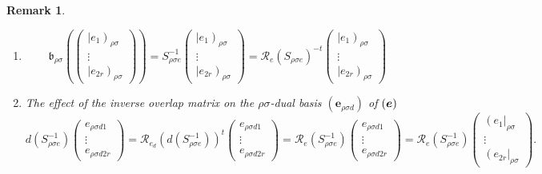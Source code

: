 \documentclass[aps,preprint]{revtex4}
\newtheorem{remark}[theorem]{Remark}
\begin{document}
\begin{remark}
\begin{enumerate}
\begin{enumerate}
\item 
\begin{equation}
\mathfrak{b}_{\rho \sigma }\left( \left( 
\begin{array}{c}
\left\vert e_{1}\right) _{\rho \sigma } \\ 
\vdots \\ 
\left\vert e_{2r}\right) _{\rho \sigma }%
\end{array}%
\right) \right) =S_{\rho \sigma e}^{-1}\left( 
\begin{array}{c}
\left\vert e_{1}\right) _{\rho \sigma } \\ 
\vdots \\ 
\left\vert e_{2r}\right) _{\rho \sigma }%
\end{array}%
\right) =\mathcal{R}_{e}\left( S_{\rho \sigma e}\right) ^{-t}\left( 
\begin{array}{c}
\left\vert e_{1}\right) _{\rho \sigma } \\ 
\vdots \\ 
\left\vert e_{2r}\right) _{\rho \sigma }%
\end{array}%
\right)
\end{equation}

\item The effect of the inverse overlap matrix on the $\rho \sigma $-dual
basis $\left( \boldsymbol{e}_{\rho \sigma d}\right) $ of $\left( \boldsymbol{%
e}\right) $ 
\begin{equation}
d\left( S_{\rho \sigma e}^{-1}\right) \left( 
\begin{array}{c}
e_{\rho \sigma d1} \\ 
\vdots \\ 
e_{\rho \sigma d2r}%
\end{array}%
\right) =\mathcal{R}_{e_{d}}\left( d\left( S_{\rho \sigma e}^{-1}\right)
\right) ^{t}\left( 
\begin{array}{c}
e_{\rho \sigma d1} \\ 
\vdots \\ 
e_{\rho \sigma d2r}%
\end{array}%
\right) =\mathcal{R}_{e}\left( S_{\rho \sigma e}^{-1}\right) \left( 
\begin{array}{c}
e_{\rho \sigma d1} \\ 
\vdots \\ 
e_{\rho \sigma d2r}%
\end{array}%
\right) =\mathcal{R}_{e}\left( S_{\rho \sigma e}^{-1}\right) \left( 
\begin{array}{c}
\left( e_{1}\right\vert _{\rho \sigma } \\ 
\vdots \\ 
\left( e_{2r}\right\vert _{\rho \sigma }%
\end{array}%
\right) .
\end{equation}


\end{enumerate}
\end{enumerate}
\end{remark}
\end{document}
